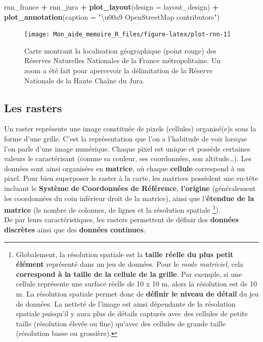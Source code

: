 \documentclass[
  french,
]{book}
\newenvironment{Shaded}{\begin{snugshade}}{\end{snugshade}}
\newcommand{\DataTypeTok}[1]{\textcolor[rgb]{0.13,0.29,0.53}{#1}}
\newcommand{\KeywordTok}[1]{\textcolor[rgb]{0.13,0.29,0.53}{\textbf{#1}}}
\newcommand{\NormalTok}[1]{#1}
\newcommand{\OperatorTok}[1]{\textcolor[rgb]{0.81,0.36,0.00}{\textbf{#1}}}
\newcommand{\StringTok}[1]{\textcolor[rgb]{0.31,0.60,0.02}{#1}}
\begin{document}
\begin{Shaded}
\begin{Highlighting}[]
\NormalTok{rnn\_france }\OperatorTok{+}\StringTok{ }\NormalTok{rnn\_jura }\OperatorTok{+}\StringTok{ }
\StringTok{  }\KeywordTok{plot\_layout}\NormalTok{(}\DataTypeTok{design =}\NormalTok{ layout\_design) }\OperatorTok{+}
\StringTok{  }\KeywordTok{plot\_annotation}\NormalTok{(}\DataTypeTok{caption =} \StringTok{"\textbackslash{}u00a9 OpenStreetMap contributors"}\NormalTok{)}
\end{Highlighting}
\end{Shaded}

\begin{figure}

{\centering \texttt{[image: Mon\_aide\_memoire\_R\_files/figure-latex/plot-rnn-1]} 

}

\caption{Carte montrant la localisation géographique (point rouge) des Réserves Naturelles Nationales de la France métropolitaine. Un zoom a été fait pour apercevoir la délimitation de la Réserve Nationale de la Haute Chaîne du Jura.}\label{fig:plot-rnn}
\end{figure}

\hypertarget{rasters}{%
\subsection{Les rasters}\label{rasters}}

Un raster représente une image constituée de pixels (cellules) organisé(e)s sous
la forme d'une grille. C'est la représentation que l'on a l'habitude de voir
lorsque l'on parle d'une image numérique. Chaque pixel est unique et possède
certaines valeurs le caractérisant (comme sa couleur, ses coordonnées, son
altitude\ldots). Les données sont ainsi organisées en \textbf{matrice}, où chaque
\textbf{cellule} correspond à un pixel. Pour bien superposer le raster à la carte,
les matrices possèdent une en-tête incluant le \textbf{Système de Coordonnées de
Référence}, \textbf{l'origine} (généralement les coordonnées du coin inférieur droit
de la matrice), ainsi que l'\textbf{étendue de la matrice} (le nombre de colonnes, de
lignes et la résolution spatiale \footnote{Globalement, la résolution spatiale est la \textbf{taille réelle du
  plus petit élément} représenté dans un jeu de données. Pour le \emph{mode
  matriciel}, cela \textbf{correspond à la taille de la cellule de la grille}. Par
  exemple, si une cellule représente une surface réelle de 10 x 10 m, alors la
  résolution est de 10 m. La résolution spatiale permet donc de \textbf{définir le
  niveau de détail} du jeu de données. La netteté de l'image est ainsi dépendante
  de la résolution spatiale puisqu'il y aura plus de détails capturés avec des
  cellules de petite taille (résolution élevée ou fine) qu'avec des cellules de
  grande taille (résolution basse ou grossière).}).\\
De par leurs caractéristiques, les rasters permettent de définir des \textbf{données
discrètes} ainsi que des \textbf{données continues}.
\end{document}
